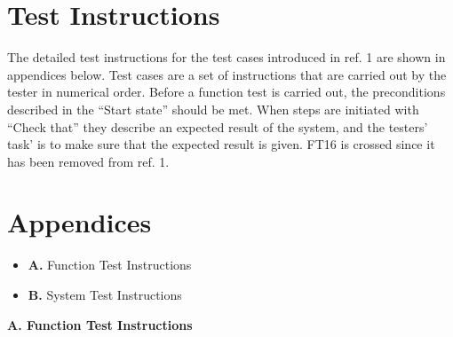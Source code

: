\documentclass{article}
\begin{document}
\section{Test Instructions}
The detailed test instructions for the test cases introduced in ref. 1 are shown in appendices below. Test cases are a set of instructions that are carried out by the tester in numerical order. Before a function test is carried out, the preconditions described in the “Start state” should be met. When steps are initiated with “Check that” they describe an expected result of the system, and the testers' task' is to make sure that the expected result is given. FT16 is crossed since it has been removed from ref. 1.

\section{Appendices}
	\begin{itemize}
		\item \textbf{A.} Function Test Instructions 
		\item \textbf{B.} System Test Instructions  	
	\end{itemize}


\newpage
\begin{flushleft}
{\large \textbf{A. Function Test Instructions}}
\end{flushleft}
		
\end{document}
